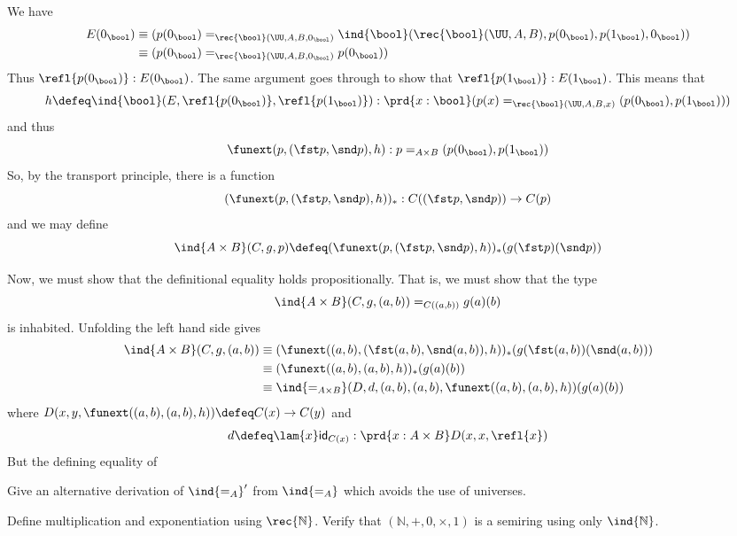 We have
\begin{align*}
  E(0_{\bool})
  &\equiv
  (p(0_{\bool}) =_{\rec{\bool}(\UU, A, B, 0_{\bool})} \ind{\bool}(\rec{\bool}(\UU, A, B),
  p(0_{\bool}), p(1_{\bool}), 0_{\bool}))
  \\&\equiv
  (p(0_{\bool}) =_{\rec{\bool}(\UU, A, B, 0_{\bool})} p(0_{\bool}))
\end{align*}
Thus $\refl{p(0_{\bool})} : E(0_{\bool})$.  The same argument goes through to
show that $\refl{p(1_{\bool})} : E(1_{\bool})$.  This means that
\[
  h \defeq
  \ind{\bool}(E, \refl{p(0_{\bool})}, \refl{p(1_{\bool})})
  :
  \prd{x : \bool} (p(x) =_{\rec{\bool}(\UU, A, B, x)} (p(0_{\bool}),
  p(1_{\bool})))
\]
and thus
\[
  \funext(p, (\fst p, \snd p), h) 
  : p =_{A \times B} (p(0_{\bool}),
  p(1_{\bool}))
\]
So, by the transport principle, there is a function
\[
  (\funext(p, (\fst p, \snd p), h))_{*} : C((\fst p, \snd p)) \to C(p)
\]
and we may define
\[
  \ind{A \times B}(C, g, p) \defeq
  (\funext(p, (\fst p, \snd p), h))_{*}(g(\fst p)(\snd p))
\]

Now, we must show that the definitional equality holds propositionally.  That
is, we must show that the type
\[
  \ind{A \times B}(C, g, (a, b)) =_{C((a, b))} g(a)(b)
\]
is inhabited.  Unfolding the left hand side gives
\begin{align*}
  \ind{A \times B}(C, g, (a, b))
  &\equiv
  (\funext((a, b), (\fst (a, b), \snd (a, b)), h))_{*}(g(\fst (a, b))(\snd (a, b)))
  \\&\equiv
  (\funext((a, b), (a, b), h))_{*}(g(a)(b))
  \\&\equiv
  \ind{=_{A\times B}}(D, d, (a, b), (a, b), \funext((a, b), (a, b), h))
  (g(a)(b))
\end{align*}
where $D(x, y, \funext((a, b), (a, b), h)) \defeq C(x) \to C(y)$ and
\[
  d \defeq \lam{x}\mathsf{id}_{C(x)} : \prd{x : A \times B}D(x, x, \refl{x})
\]
But the defining equality of 




 Give an alternative derivation of $\ind{=_{A}}'$ from
$\ind{=_{A}}$ which avoids the use of universes.

  Define multiplication and exponentiation using
$\rec{\mathbb{N}}$.  Verify that $(\mathbb{N}, +, 0, \times, 1)$ is a semiring
using only $\ind{\mathbb{N}}$.

